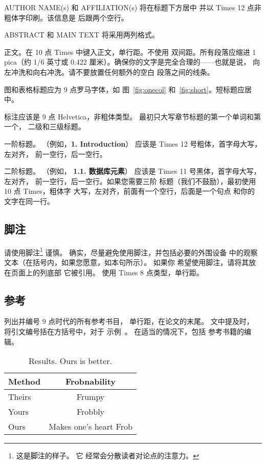 \documentclass[10pt,letterpaper,a4paper]{article}
\begin{document}
\begin{sloppypar}
AUTHOR NAME(s) 和 AFFILIATION(s) 将在标题下方居中
并以 Times 12 点非粗体字印刷。该信息是
后跟两个空行。

ABSTRACT 和 MAIN TEXT 将采用两列格式。

正文。在 10 点 Times 中键入正文，单行距。不使用
双间距。所有段落应缩进 1 pica（约 1/6
英寸或 0.422 厘米）。确保你的文字是完全合理的——也就是说，
向左冲洗和向右冲洗。请不要放置任何额外的空白
段落之间的线条。

图和表格标题应为 9 点罗马字体，如
图~\ref{fig:onecol} 和~\ref{fig:short}。短标题应居中。

\noindent 标注应该是 9 点 Helvetica，非粗体类型。
最初只大写章节标题的第一个单词和第一个，
二级和三级标题。

一阶标题。 （例如，{\large \bf 1. Introduction}）
应该是 Times 12 号粗体，首字母大写，左对齐，
前一空行，后一空行。

二阶标题。 （例如，{ \bf 1.1. 数据库元素}）
应该是 Times 11 号黑体，首字母大写，左对齐，
前一空行，后一空行。如果您需要三阶
标题（我们不鼓励），最初使用 10 点 Times，粗体字
大写，左对齐，前面有一个空行，后面是一个句点
和你的文字在同一行。

\subsection{脚注}
请使用脚注\footnote {这是脚注的样子。 它
经常会分散读者对论点的注意力。} 谨慎。
确实，尽量避免使用脚注，并包括必要的外围设备
中的观察
文本（在括号内，如果您愿意，如本句所示）。 如果你
希望使用脚注，请将其放在页面上的列底部
它被引用。 使用 Times 8 点类型，单行距。

\subsection{参考}
列出并编号 9 点时代的所有参考书目，
单行距，在论文的末尾。 文中提及时，
将引文编号括在方括号中，对于
示例~\citet{Authors20}。 在适当的情况下，包括
参考书籍的编辑。

\begin{table}
\begin{center}
\begin{tabular}{|l|c|}
\hline
Method & Frobnability \\
\hline\hline
Theirs & Frumpy \\
Yours & Frobbly \\
Ours & Makes one's heart Frob\\
\hline
\end{tabular}
\end{center}
\caption{Results.   Ours is better.}
\end{table}


\end{sloppypar}
\end{document}
